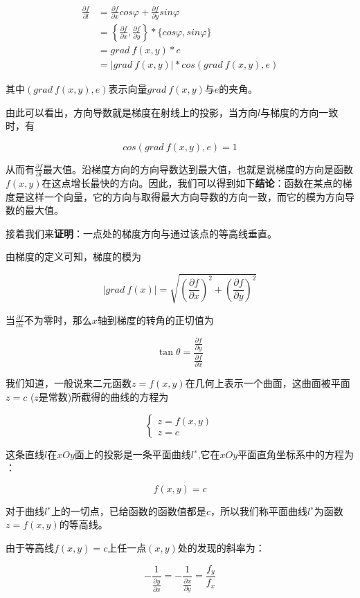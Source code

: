 \documentclass[]{book}
\begin{document}
\[
\begin{aligned}
\frac{\partial f}{\partial {l}}
&=\frac{\partial f}{\partial {x}}cos\varphi+\frac{\partial f}{\partial {y}}sin\varphi \\
&=\left \{ \frac{\partial f}{\partial {x}},\frac{\partial f}{\partial {y}} \right\}*\{cos\varphi,sin\varphi\} \\
&=grad\ f(x,y)*e \\
&=|grad\ f(x,y)|*cos(grad\ f(x,y),e)
\end{aligned}
\]

其中\((grad\ f(x,y),e)\)表示向量\(grad\ f(x,y)\)与\(e\)的夹角。

由此可以看出，方向导数就是梯度在射线上的投影，当方向\(l\)与梯度的方向一致时，有

\[
cos\left(grad\ f(x,y),e\right)=1
\]

从而有\(\frac{\partial f}{\partial {l}}\)最大值。沿梯度方向的方向导数达到最大值，也就是说梯度的方向是函数\(f(x,y)\)在这点增长最快的方向。因此，我们可以得到如下\textbf{结论}：函数在某点的梯度是这样一个向量，它的方向与取得最大方向导数的方向一致，而它的模为方向导数的最大值。

接着我们来\textbf{证明}：一点处的梯度方向与通过该点的等高线垂直。

由梯度的定义可知，梯度的模为

\[
|grad \ f(x)|=\sqrt{(\frac{\partial f}{\partial {x}})^2+(\frac{\partial f}{\partial {y}})^2}
\]

当\(\frac{\partial f}{\partial x}\)不为零时，那么\(x\)轴到梯度的转角的正切值为

\[
\tan\theta=\frac{\frac{\partial f}{\partial y}}{\frac{\partial f}{\partial x}}
\]

我们知道，一般说来二元函数\(z=f(x,y)\)在几何上表示一个曲面，这曲面被平面\(z=c\) (\(z\)是常数)所截得的曲线的方程为

\[
\begin{cases}
z=f(x,y) \\
z=c
\end{cases}
\]

这条直线\(l\)在\(xOy\)面上的投影是一条平面曲线\(l^∗\),它在\(xOy\)平面直角坐标系中的方程为 ：

\[
f(x,y)=c
\]

对于曲线\(l^∗\)上的一切点，已给函数的函数值都是\(c\)，所以我们称平面曲线\(l^∗\)为函数\(z=f(x,y)\)的等高线。

由于等高线\(f(x,y)=c\)上任一点\((x,y)\)处的发现的斜率为：

\[
-\frac{1}{\frac{\partial y}{\partial x}}=-\frac{1}{\frac{\partial x}{\partial y}}=\frac{f_y}{f_x}
\]
\end{document}
